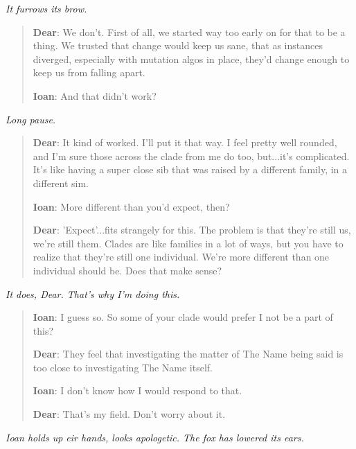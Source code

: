 \emph{It furrows its brow.}

\begin{quote}
\textbf{Dear}: We don't. First of all, we started way too early on for that to be a thing. We trusted that change would keep us sane, that as instances diverged, especially with mutation algos in place, they'd change enough to keep us from falling apart.

\textbf{Ioan}: And that didn't work?
\end{quote}

\emph{Long pause.}

\begin{quote}
\textbf{Dear}: It kind of worked. I'll put it that way. I feel pretty well rounded, and I'm sure those across the clade from me do too, but...it's complicated. It's like having a super close sib that was raised by a different family, in a different sim.

\textbf{Ioan}: More different than you'd expect, then?

\textbf{Dear}: 'Expect'...fits strangely for this. The problem is that they're still us, we're still them. Clades are like families in a lot of ways, but you have to realize that they're still one individual. We're more different than one individual should be. Does that make sense?
\end{quote}

\emph{It does, Dear. That's why I'm doing this.}

\begin{quote}
\textbf{Ioan}: I guess so. So some of your clade would prefer I not be a part of this?

\textbf{Dear}: They feel that investigating the matter of The Name being said is too close to investigating The Name itself.

\textbf{Ioan}: I don't know how I would respond to that.

\textbf{Dear}: That's my field. Don't worry about it.
\end{quote}

\emph{Ioan holds up eir hands, looks apologetic. The fox has lowered its ears.}

